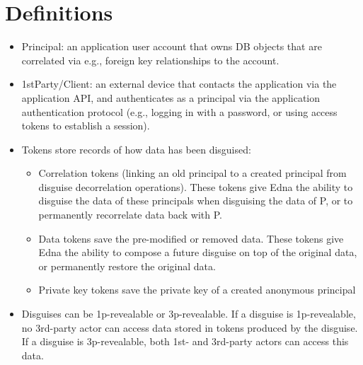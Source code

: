\section{Definitions}
\begin{itemize}
\item Principal: an application user account that owns DB objects that are correlated via e.g., foreign key relationships to the account.
\item 1stParty/Client: an external device that contacts the application via the application API, and
authenticates as a principal via the application authentication protocol (e.g., logging in with a password, or using access tokens to establish a session).
\item Tokens store records of how data has been disguised: 
\begin{itemize}
    \item Correlation tokens (linking an old principal to a created principal from disguise decorrelation operations). These tokens give Edna the ability to disguise the data of these principals when disguising the data of P, or to permanently recorrelate data back with P.
    \item Data tokens save the pre-modified or removed data. These tokens give Edna the ability to compose a future disguise on top of the original data, or permanently restore the original data.
    \item Private key tokens save the private key of a created anonymous principal
\end{itemize}
\item Disguises can be 1p-revealable or 3p-revealable. If a disguise is 1p-revealable, no 3rd-party
actor can access data stored in tokens produced by the disguise. If a disguise is 3p-revealable,
both 1st- and 3rd-party actors can access this data.
\end{itemize}

